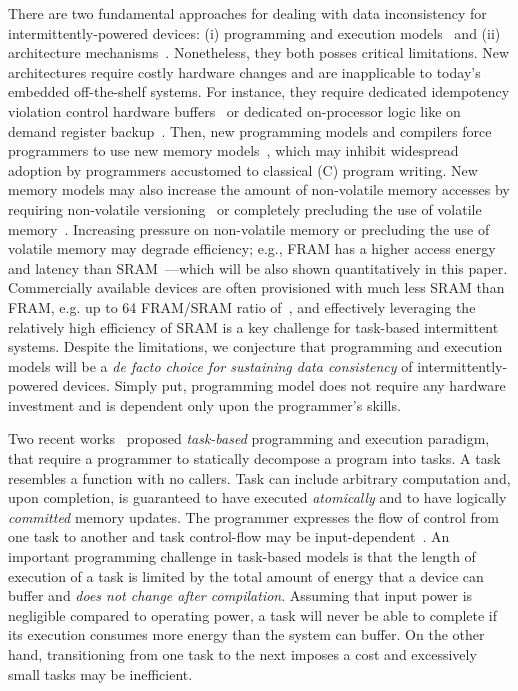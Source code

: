 There are two fundamental approaches for dealing with data inconsistency for intermittently-powered devices: (i) programming and execution models~\cite{dino,ratchet,chain,alpaca} and (ii) architecture mechanisms~\cite{hicks_isca_2017,idetic,nvp}. Nonetheless, they both posses critical limitations. New architectures require costly hardware changes and are inapplicable to today's embedded off-the-shelf systems. For instance, they require dedicated idempotency violation control hardware buffers~\cite[Fig. 3]{hicks_isca_2017} or dedicated on-processor logic like on demand register backup~\cite[Fig. 9]{nvp}. Then, new programming models and compilers force programmers to use new memory models~\cite{chain,ratchet}, which may inhibit widespread adoption by programmers accustomed to classical (C) program writing. New memory models may also increase the amount of non-volatile memory accesses by requiring non-volatile versioning~\cite{chain} or completely precluding the use of volatile memory~\cite{ratchet}. Increasing pressure on non-volatile memory or precluding the use of volatile memory may degrade efficiency; e.g., FRAM has a higher access energy and latency than SRAM~\cite[Fig. 4]{nvp}---which will be also shown quantitatively in this paper. Commercially available devices are often provisioned with much less SRAM than FRAM, e.g. up to 64 FRAM/SRAM ratio of~\cite{wolverine}, and effectively leveraging the relatively high efficiency of SRAM is a key challenge for task-based intermittent systems. Despite the limitations, we conjecture that programming and execution models will be a {\em de facto choice for sustaining data consistency} of intermittently-powered devices. Simply put, programming model does not require any hardware investment and is dependent only upon the programmer's skills.

Two recent works~\cite{alpaca,chain} proposed {\em task-based} programming and execution paradigm, that require a programmer to statically decompose a program into tasks. A task resembles a function with no callers. Task can include arbitrary computation and, upon completion, is guaranteed to have executed {\em atomically} and to have logically {\em committed} memory updates. The programmer expresses the flow of control from one task to another and task control-flow may be input-dependent~\cite[Fig. 4]{chain}. An important programming challenge in task-based models is that the length of execution of a task is limited by the total amount of energy that a device can buffer and {\em does not change after compilation}. Assuming that input power is negligible compared to operating power, a task will never be able to complete if its execution consumes more energy than the system can buffer. On the other hand, transitioning from one task to the next imposes a cost and excessively small tasks may be inefficient. 

